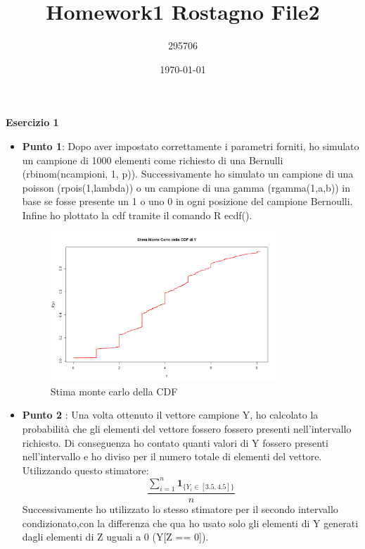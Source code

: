 \documentclass[a4paper,12pt]{article}
\begin{document}
	\title{\textbf{Homework1 Rostagno File2}}
	\author{295706}
	\date{\today}
	\maketitle
	
\centering \textbf{Esercizio 1}\\
\begin{itemize}
	\item \textbf{Punto 1}: Dopo aver impostato correttamente i parametri forniti, ho simulato un campione di 1000 elementi come richiesto di una Bernulli (rbinom(ncampioni, 1, p)). Successivamente ho simulato un campione di una poisson (rpois(1,lambda)) o un campione di una gamma (rgamma(1,a,b)) in base se fosse presente un 1 o uno 0 in ogni posizione del campione Bernoulli. Infine ho plottato la cdf tramite il comando R ecdf().
	\begin{figure}[h] %
		\centering %
		\includegraphics[width=0.8\textwidth]{fRip.png} %
		\caption{Stima monte carlo della CDF} %
		\label{fig:immagine} %
	\end{figure}
	\item  \textbf{Punto 2} : Una volta ottenuto il vettore campione Y, ho calcolato la probabilità che gli elementi del vettore fossero fossero presenti nell'intervallo richiesto. Di conseguenza ho contato quanti valori di Y fossero presenti nell'intervallo e ho diviso per il numero totale di elementi del vettore.\\
	Utilizzando questo stimatore:\\ 
	\[
	\frac{\sum_{i=1}^n \mathbf{1}_{\{Y_i \in [3.5, 4.5]\}}}{n}
	\] 
	Successivamente ho utilizzato lo stesso stimatore per il secondo intervallo condizionato,con la differenza che qua ho usato solo gli elementi di Y generati dagli elementi di Z uguali a 0 (Y[Z == 0]).\\

\end{itemize}
\end{document}
